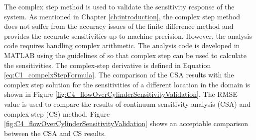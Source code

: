 The complex step method is used to validate the sensitivity response of the system. As mentioned in Chapter \ref{ch:introduction}, the complex step method does not suffer from the accuracy issues of the finite difference method and provides the accurate sensitivities up to machine precision. However, the analysis code requires handling complex arithmetic. The analysis code is developed in MATLAB using the guidelines of \cite{martins2003complex} so that complex step can be used to calculate the sensitivities. The complex-step derivative is defined in Equation \eqref{eq:C1_compelxStepFormula}. The comparison of the CSA results with the complex step solution for the sensitivities of a different location in the domain is shown in Figure \ref{fig:C4_flowOverCylinderSensitivityValidation}. The RMSE value is used to compare the results of continuum sensitivity analysis (CSA) and complex step (CS) method. Figure \ref{fig:C4_flowOverCylinderSensitivityValidation} shows an acceptable comparison between the CSA and CS results.
%
